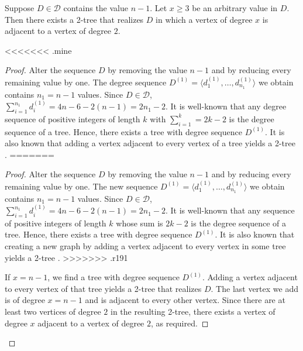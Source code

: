 \documentclass[lotsofwhite,charterfonts]{patmorin}
\begin{document}
\begin{lem}
Suppose $D\in \mathcal{D}$ contains the value $n-1$. Let $x \geq 3$ be
an arbitrary value in $D$.  Then there exists a 2-tree that realizes
$D$ in which a vertex of degree $x$ is adjacent to a vertex of degree
$2$.
\end{lem}

<<<<<<< .mine
\begin{proof}
Alter the sequence $D$ by removing the value $n-1$ and by reducing
every remaining value by one. The degree sequence $D^{(1)} = \langle
d_1^{(1)},\ldots,d_{n_1}^{(1)}\rangle$ we obtain contains $n_1 = n-1$
values.  Since $D\in \mathcal{D}$,
$\sum_{i=1}^{n_1}d^({1})_i = 4n-6 - 2(n-1) = 2n_1 - 2$. It is
well-known that any degree sequence of positive integers of length $k$
with $\sum_{i=1}^{k} = 2k - 2$ is the degree sequence of a tree.
Hence, there exists a tree with degree sequence $D^{(1)}$.  It is also
known that adding a vertex adjacent to every vertex of a tree yields a
2-tree \cite{X}.
=======
\begin{proof} 
Alter the sequence $D$ by removing the value $n-1$ and by reducing
every remaining value by one. The new sequence $D^{(1)} = \langle
d_1^{(1)},\ldots,d_{n_1}^{(1)}\rangle$ we obtain contains $n_1 = n-1$
values.  Since $D\in \mathcal{D}$, $\sum_{i=1}^{n_1} d^{(1)}_i= 4n-6 -
2(n-1) = 2n_1-2$. It is well-known that any sequence of positive
integers of length $k$ whose sum is $2k-2$ is the degree sequence of a
tree. Hence, there exists a tree with degree sequence $D^{(1)}$. It is
also known that creating a new graph by adding a vertex adjacent to
every vertex in some tree yields a 2-tree \cite{?}.
>>>>>>> .r191

If $x = n-1$, we find a tree with degree sequence $D^{(1)}$. Adding a
vertex adjacent to every vertex of that tree yields a 2-tree that
realizes $D$. The last vertex we add is of degree $x = n-1$ and is
adjacent to every other vertex. Since there are at least two vertices
of degree $2$ in the resulting 2-tree, there exists a vertex of degree
$x$ adjacent to a vertex of degree $2$, as required.


\end{proof}
\end{proof}
\end{document}
